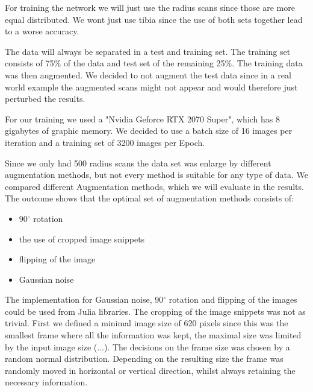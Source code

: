 \documentclass[
a4paper, 
12pt,
grayscalebody, %
abstract=on,
twoside, BCOR10mm, 12pt, DIV13,headinclude, footexclude, final, abstracton, openright
]{ibireprt}
\numberwithin{equation}{chapter}
\numberwithin{table}{chapter}
\numberwithin{figure}{chapter}
\numberwithin{algorithm}{chapter}
\numberwithin{example}{chapter}
\numberwithin{example}{chapter}
\begin{document}
For training the network  we will just use the radius scans since those are more equal distributed. We wont just use tibia since the use of both sets together lead to a worse accuracy.

The data will always be separated in a test and training set. The training set consists of 75\% of the data and test set of the remaining 25\%. The training data was then augmented. We decided to not augment the test data since in a real world example the augmented scans might not appear and would therefore just perturbed the results. 

For our training we used a "Nvidia Geforce RTX 2070 Super", which has 8 gigabytes of graphic memory. We decided to use a batch size of 16 images per iteration and a training set of 3200 images per Epoch. 

Since we only had 500 radius scans the data set was enlarge by different augmentation methods, but not every method is suitable for any type of data. We compared different Augmentation methods, which we will evaluate in the results. The outcome shows that the optimal set of augmentation methods consists of:

\begin{itemize}
	\item 90$^{\circ}$ rotation
		\item the use of cropped image snippets 
	\item flipping of the image
	\item Gaussian noise

\end{itemize}

The implementation for Gaussian noise, 90$^{\circ}$ rotation and flipping of the images could be used from Julia libraries. The cropping of the image snippets was not as trivial. First we defined a minimal image size of 620 pixels since this was the smallest frame where all the information was kept, the maximal size was limited by the input image size (...). The decisions on the frame size was chosen by a random normal distribution. Depending on the resulting size the frame was randomly moved in horizontal or vertical direction, whilst always retaining the necessary information.
\end{document}
